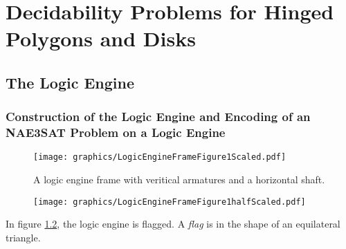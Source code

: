 \chapter{Decidability Problems for Hinged Polygons and Disks}
\section{The Logic Engine}

\subsection{Construction of the Logic Engine and Encoding of an NAE3SAT Problem on a Logic 
Engine}
\begin{figure}[!h]
\begin{center}
\texttt{[image: graphics/LogicEngineFrameFigure1Scaled.pdf]}
\caption{A logic engine frame with veritical armatures and a horizontal 
shaft.}\label{fig:LogicEngineFrameFigure1.pdf}
\end{center}
\end{figure}

% 
\begin{figure}[!h]
\begin{center}
\texttt{[image: graphics/LogicEngineFrameFigure1halfScaled.pdf]}
\caption{}\label{fig:LogicEngineFrameFigure2.pdf-1}
\end{center}
\end{figure}
In figure \ref{fig:LogicEngineFrameFigure2.pdf-1}, the logic engine is flagged.  A \textit{flag} is 
 in the shape of an equilateral triangle.

